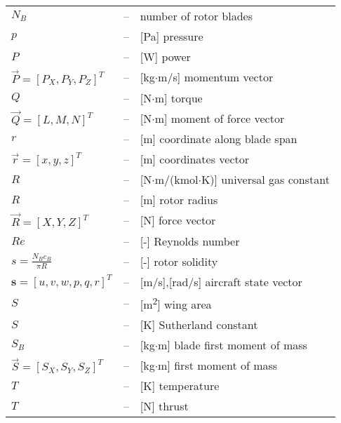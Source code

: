 \begin{longtable}[l]{ l l p{} }
  $N_B$                                                  & -- & number of rotor blades \\
  $p$                                                    & -- & [Pa] pressure \\
  $P$                                                    & -- & [W] power \\
  $\vec P=\left[ P_X, P_Y, P_Z \right]^T$                & -- & [kg$\cdot$m/s] momentum vector \\
  $Q$                                                    & -- & [N$\cdot$m] torque \\
  $\vec Q=\left[ L, M, N \right]^T$                      & -- & [N$\cdot$m] moment of force vector \\
  $r$                                                    & -- & [m] coordinate along blade span \\
  $\vec r=\left[ x, y, z \right]^T$                      & -- & [m] coordinates vector \\
  $R$                                                    & -- & [N$\cdot$m/(kmol$\cdot$K)] universal gas constant \\
  $R$                                                    & -- & [m] rotor radius \\
  $\vec R=\left[ X, Y, Z \right]^T$                      & -- & [N] force vector \\
  $Re$                                                   & -- & [-] Reynolds number \\
  $s=\frac{N_B c_B}{\pi R}$                              & -- & [-] rotor solidity \\
  $\boldsymbol s=\left[ u,v,w,p,q,r \right]^T$           & -- & [m/s],[rad/s] aircraft state vector \\
  $S$                                                    & -- & [m\textsuperscript{2}] wing area \\
  $S$                                                    & -- & [K] Sutherland constant \\
  $S_B$                                                  & -- & [kg$\cdot$m] blade first moment of mass \\
  $\vec S=\left[ S_X, S_Y, S_Z \right]^T$                & -- & [kg$\cdot$m] first moment of mass \\
  $T$                                                    & -- & [K] temperature \\
  $T$                                                    & -- & [N] thrust \\

\end{longtable}
